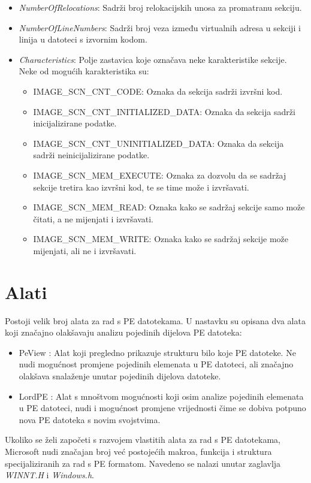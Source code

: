 \documentclass[times, utf8, diplomski, numeric]{fer}
\begin{document}
\begin{itemize}
\item \emph{NumberOfRelocations}: Sadrži broj relokacijskih unosa
za promatranu sekciju.

\item \emph{NumberOfLineNumbers}: Sadrži broj veza između
virtualnih adresa u sekciji i linija u datoteci s izvornim kodom.

\item \emph{Characteristics}: Polje zastavica koje označava neke
karakteristike sekcije. Neke od mogućih karakteristika su:

\begin{itemize}
\item IMAGE\_SCN\_CNT\_CODE: Oznaka da sekcija
sadrži izvršni kod.

\item IMAGE\_SCN\_CNT\_INITIALIZED\_DATA:
Oznaka da sekcija sadrži inicijalizirane podatke.

\item IMAGE\_SCN\_CNT\_UNINITIALIZED\_DATA: Oznaka da sekcija sadrži
neinicijalizirane podatke.

\item IMAGE\_SCN\_MEM\_EXECUTE: Oznaka za dozvolu da se sadržaj
sekcije tretira kao izvršni kod, te se time može i izvršavati.

\item IMAGE\_SCN\_MEM\_READ: Oznaka kako se sadržaj sekcije samo
može čitati, a ne mijenjati i izvršavati.

\item IMAGE\_SCN\_MEM\_WRITE: Oznaka kako se sadržaj
sekcije može mijenjati, ali ne i izvršavati.
\end{itemize}

\end{itemize}


\section{Alati}

Postoji velik broj alata za rad s PE datotekama. U nastavku su 
opisana dva alata koji značajno olakšavaju analizu pojedinih dijelova
PE datoteka:

\begin{itemize}
\item PeView \citep{peview}: Alat koji pregledno prikazuje strukturu bilo koje
PE datoteke. Ne nudi mogućnost promjene pojedinih elemenata u PE
datoteci, ali značajno olakšava snalaženje unutar pojedinih
dijelova datoteke.

\item LordPE \citep{lordpe}: Alat s mnoštvom mogućnosti koji osim analize pojedinih elemenata 
u PE datoteci, nudi i mogućnost promjene vrijednosti čime se dobiva
potpuno nova PE datoteka s novim svojstvima.
\end{itemize}
Ukoliko se želi započeti s razvojem vlastitih alata za rad s PE datotekama,
Microsoft nudi značajan broj već postojećih makroa, funkcija i
struktura specijaliziranih za rad s PE formatom. Navedeno se
nalazi unutar zaglavlja \emph{WINNT.H} i \emph{Windows.h}.
\end{document}
